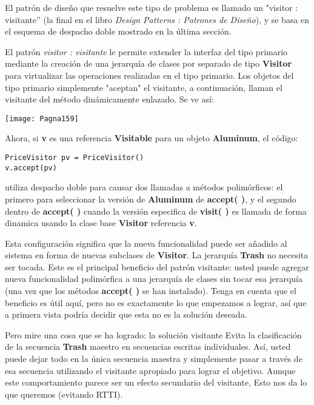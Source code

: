 El patrón de diseño que resuelve este tipo de problema es llamado un "visitor : visitante” (la final en el libro \textit{Design Patterns : Patrones de Diseño}), y se basa en el esquema de despacho doble mostrado en la última sección. \newline

El patrón \textit{visitor : visitante} le permite extender la interfaz del tipo primario mediante la creación de una jerarquía de clases por separado de tipo \textbf{Visitor} para virtualizar las operaciones realizadas en el tipo primario. Los objetos del tipo primario simplemente "aceptan" el visitante,  a continuación, llaman el visitante del método dinámicamente enlazado. Se ve así:       \newline

\texttt{[image: Pagna159]}

Ahora, si \textbf{v} es una referencia \textbf{Visitable} para un objeto \textbf{Aluminum}, el código:    \newline

\begin{lstlisting} 
PriceVisitor pv = PriceVisitor() 
v.accept(pv) 
\end{lstlisting}

utiliza despacho doble para causar dos llamadas a métodos polimórficos: el primero para seleccionar la versión de \textbf{Aluminum} de \textbf{accept( )}, y el segundo dentro de \textbf{accept( )} cuando la versión especifica de \textbf{visit( )} es llamada de forma dinamica usando la clase base \textbf{Visitor} referencia \textbf{v}.         \newline

Esta configuración significa que la nueva funcionalidad puede ser añadido al sistema en forma de nuevas subclases de \textbf{Visitor}. La jerarquía \textbf{Trash} no necesita ser tocada. Este es el principal beneficio del patrón visitante: usted puede agregar nueva funcionalidad polimórfica a una jerarquía de clases sin tocar esa jerarquía (una vez que los métodos \textbf{accept( )} se han instalado). Tenga en cuenta que el beneficio es útil aquí, pero no es exactamente lo que empezamos a lograr, así que a primera vista podría decidir que esta no es la solución deseada.      \newline

Pero mire una cosa que se ha logrado: la solución visitante Evita la clasificación de la secuencia \textbf{Trash} maestro en secuencias escritas individuales. Así, usted puede dejar todo en la única secuencia maestra y simplemente pasar a través de esa secuencia utilizando el visitante apropiado para lograr el objetivo. Aunque este comportamiento parece ser un efecto secundario del visitante, Esto nos da lo que queremos (evitando RTTI).       \newline

